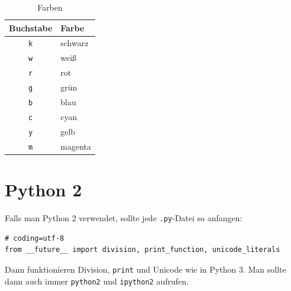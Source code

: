 \begin{table}[H]
  \centering{}
  \caption{Farben}
  \label{tab:plt_colors}
  \begin{tabular}{c l}
    \toprule
      Buchstabe & Farbe \\
    \midrule
      \texttt{k} & schwarz \\
      \texttt{w} & weiß \\
      \texttt{r} & rot \\
      \texttt{g} & grün \\
      \texttt{b} & blau \\
      \texttt{c} & cyan \\
      \texttt{y} & gelb \\
      \texttt{m} & magenta \\
    \bottomrule
  \end{tabular}
\end{table}


\section{Python 2}
Falls man Python 2 verwendet, sollte jede \texttt{.py}-Datei so anfangen:
\begin{verbatim}
# coding=utf-8
from __future__ import division, print_function, unicode_literals
\end{verbatim}
Dann funktionieren Division, \texttt{print} und Unicode wie in Python 3.
Man sollte dann auch immer \texttt{python2} und \texttt{ipython2} aufrufen.

